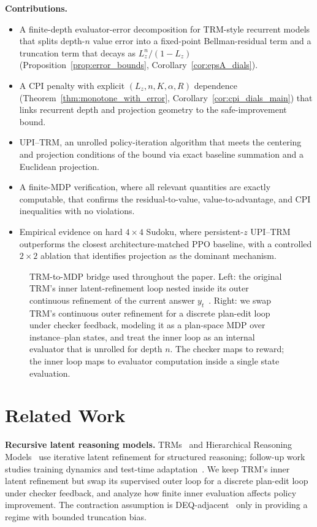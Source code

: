\documentclass{article}
\theoremstyle{plain}
\theoremstyle{definition}
\theoremstyle{remark}
\begin{document}
\textbf{Contributions.}
\begin{itemize}[leftmargin=1.2em,topsep=0pt,itemsep=2pt]
\item A finite-depth evaluator-error decomposition for TRM-style recurrent models that splits depth-$n$ value error into a fixed-point Bellman-residual term and a truncation term that decays as $L_z^n/(1-L_z)$ (Proposition~\ref{prop:error_bounds}, Corollary~\ref{cor:epsA_dials}).
\item A CPI penalty with explicit $(L_z,n,K,\alpha,R)$ dependence (Theorem~\ref{thm:monotone_with_error}, Corollary~\ref{cor:cpi_dials_main}) that links recurrent depth and projection geometry to the safe-improvement bound.
\item UPI--TRM, an unrolled policy-iteration algorithm that meets the centering and projection conditions of the bound via exact baseline summation and a Euclidean projection.
\item A finite-MDP verification, where all relevant quantities are exactly computable, that confirms the residual-to-value, value-to-advantage, and CPI inequalities with no violations.
\item Empirical evidence on hard $4\times 4$ Sudoku, where persistent-$z$ UPI--TRM outperforms the closest architecture-matched PPO baseline, with a controlled $2\times 2$ ablation that identifies projection as the dominant mechanism.
\end{itemize}

\begin{figure}[t]
\centering
\resizebox{0.82\linewidth}{!}{}
\caption{TRM-to-MDP bridge used throughout the paper. Left: the original TRM's inner latent-refinement loop nested inside its outer continuous refinement of the current answer $y_t$~\citep{TRM2025}. Right: we swap TRM's continuous outer refinement for a discrete plan-edit loop under checker feedback, modeling it as a plan-space MDP over instance--plan states, and treat the inner loop as an internal evaluator that is unrolled for depth $n$. The checker maps to reward; the inner loop maps to evaluator computation inside a single state evaluation.}
\label{fig:trm_architecture}
\end{figure}

\section{Related Work}
\label{sec:related_work}

\textbf{Recursive latent reasoning models.}
TRMs~\citep{TRM2025} and Hierarchical Reasoning Models~\citep{HRM2025} use iterative latent refinement for structured reasoning; follow-up work studies training dynamics and test-time adaptation~\citep{Qasim2025CGAR,McGovern2025TRMAdapt}. We keep TRM's inner latent refinement but swap its supervised outer loop for a discrete plan-edit loop under checker feedback, and analyze how finite inner evaluation affects policy improvement. The contraction assumption is DEQ-adjacent~\citep{Bai2019DEQ} only in providing a regime with bounded truncation bias.
\end{document}

